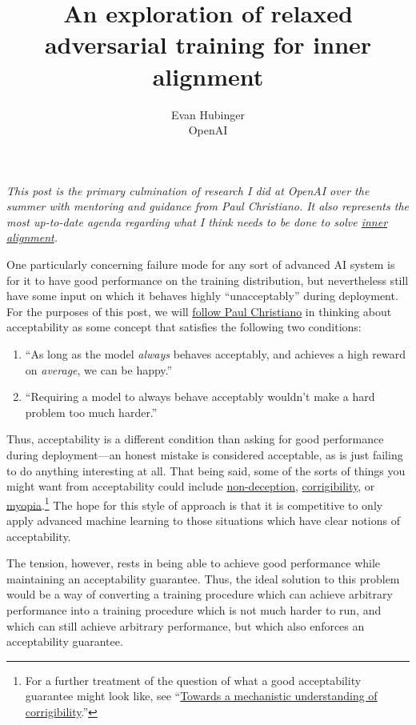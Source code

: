 \documentclass{amsart}
\title{An exploration of relaxed adversarial training for inner alignment}
\author{Evan Hubinger \\ OpenAI}
\begin{document}
\maketitle

\textit{This post is the primary culmination of research I did at OpenAI over the summer with mentoring and guidance from Paul Christiano. It also represents the most up-to-date agenda regarding what I think needs to be done to solve \href{https://arxiv.org/abs/1906.01820}{inner alignment}.}

One particularly concerning failure mode for any sort of advanced AI system is for it to have good performance on the training distribution, but nevertheless still have some input on which it behaves highly ``unacceptably'' during deployment. For the purposes of this post, we will \href{https://ai-alignment.com/training-robust-corrigibility-ce0e0a3b9b4d}{follow Paul Christiano} in thinking about acceptability as some concept that satisfies the following two conditions:
\begin{enumerate}
    \item ``As long as the model \textit{always} behaves acceptably, and achieves a high reward on \textit{average}, we can be happy.''
    \item ``Requiring a model to always behave acceptably wouldn't make a hard problem too much harder.''
\end{enumerate}
Thus, acceptability is a different condition than asking for good performance during deployment---an honest mistake is considered acceptable, as is just failing to do anything interesting at all. That being said, some of the sorts of things you might want from acceptability could include \href{https://www.alignmentforum.org/posts/zthDPAjh9w6Ytbeks/deceptive-alignment/}{non-deception}, \href{https://ai-alignment.com/corrigibility-3039e668638}{corrigibility}, or \href{https://www.alignmentforum.org/posts/BKM8uQS6QdJPZLqCr/towards-a-mechanistic-understanding-of-corrigibility}{myopia}.\footnote{For a further treatment of the question of what a good acceptability guarantee might look like, see ``\href{https://www.alignmentforum.org/posts/BKM8uQS6QdJPZLqCr/towards-a-mechanistic-understanding-of-corrigibility}{Towards a mechanistic understanding of corrigibility}.''} The hope for this style of approach is that it is competitive to only apply advanced machine learning to those situations which have clear notions of acceptability.

The tension, however, rests in being able to achieve good performance while maintaining an acceptability guarantee. Thus, the ideal solution to this problem would be a way of converting a training procedure which can achieve arbitrary performance into a training procedure which is not much harder to run, and which can still achieve arbitrary performance, but which also enforces an acceptability guarantee.
\end{document}
